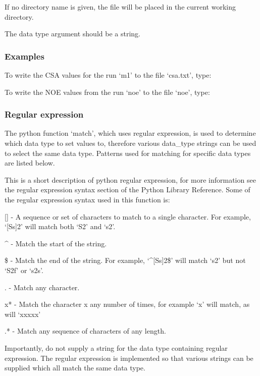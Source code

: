 If no directory name is given, the file will be placed in the current working directory.

The data type argument should be a string.


\subsubsection{Examples}

To write the CSA values for the run `m1' to the file `csa.txt', type:



To write the NOE values from the run `noe' to the file `noe', type:





\subsubsection{Regular expression}

The python function `match', which uses regular expression, is used to determine which data
type to set values to, therefore various data\_type strings can be used to select the same
data type.  Patterns used for matching for specific data types are listed below.

This is a short description of python regular expression, for more information see the
regular expression syntax section of the Python Library Reference.  Some of the regular
expression syntax used in this function is:

    [] - A sequence or set of characters to match to a single character.  For example,
    `[Ss]2' will match both `S2' and `s2'.

    \^{} - Match the start of the string.

    \$ - Match the end of the string.  For example, `\^{}[Ss]2\$' will match `s2' but not `S2f'
    or `s2s'.

    . - Match any character.

    x* - Match the character x any number of times, for example `x' will match, as will
    `xxxxx'

    .* - Match any sequence of characters of any length.

Importantly, do not supply a string for the data type containing regular expression.  The
regular expression is implemented so that various strings can be supplied which all match
the same data type.


